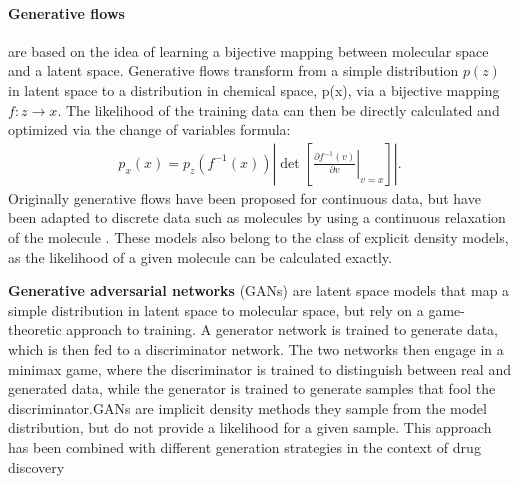\paragraph{Generative flows} \citep{rezendeVariationalInferenceNormalizing2016} are based on the idea of learning a bijective mapping between molecular
space and a latent space. Generative flows transform from a simple distribution $p(z)$ in latent space
to a distribution in chemical space, p(x), via a bijective mapping $f: z \rightarrow x$.
The likelihood of the training data can then be directly calculated and optimized
via the change of variables formula:
\begin{align}
      p_x(x) = p_z(f^{-1}(x)) \left|
      \det \left[
      \left. \frac{\partial f^{-1}(v)}{\partial v} \right|_{v=x}
      \right]
      \right|.
\end{align}
Originally generative flows have been proposed for continuous data, but have been adapted to
discrete data such as molecules by using a continuous relaxation of the molecule
\citep{madhawaGraphNVPInvertibleFlow2019}. These models also belong to the class of explicit density
models, as the likelihood of a given molecule can be calculated exactly.

\textbf{Generative adversarial networks} (GANs) \citep{goodfellowGenerativeAdversarialNetworks2014}
are latent space models that map a simple distribution in latent space to molecular space, but rely
on a game-theoretic approach to training. A generator network is trained to generate data, which is
then fed to a discriminator network. The two networks then engage in a minimax game, where the
discriminator is trained to distinguish between real and generated data, while the generator
is trained to generate samples that fool the discriminator.\@ \acp{GAN} are implicit density methods they sample from the
model distribution, but do not provide a likelihood for a given sample. This approach has been
combined with different generation strategies in the context of drug discovery \citep{decaoMolGANImplicitGenerative2018,kadurinDruGANAdvancedGenerative2017,guimaraesObjectiveReinforcedGenerativeAdversarial2017,mendez-lucioNovoGenerationHitlike2018}



